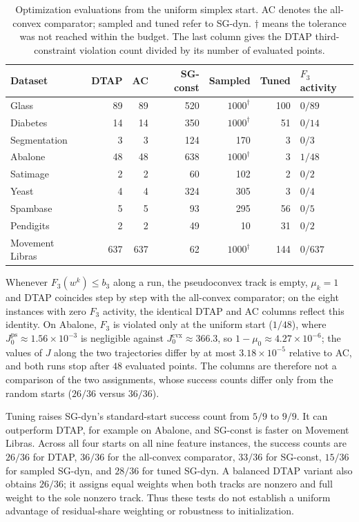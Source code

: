 \documentclass[]{interact}
\theoremstyle{plain}
\theoremstyle{definition}
\theoremstyle{remark}
\newcommand{\cvx}{\mathrm{cvx}}
\newcommand{\ps}{\mathrm{ps}}
\begin{document}
\begin{table}[t]
\centering\small
\setlength{\tabcolsep}{4pt}
\caption{Optimization evaluations from the uniform simplex start.
AC denotes the all-convex comparator; sampled and tuned refer to SG-dyn.
$\dagger$ means the tolerance was not reached within the budget.
The last column gives the DTAP third-constraint violation count divided
by its number of evaluated points.}
\label{tab:activation-tuning}
\begin{tabular}{@{}lrrrrrl@{}}
\toprule
Dataset & DTAP & AC & SG-const & Sampled & Tuned & $F_3$ activity\\
\midrule
Glass        & 89 & 89 & 520 & $1000^\dagger$ & 100 & $0/89$\\
Diabetes     & 14 & 14 & 350 & $1000^\dagger$ & 51 & $0/14$\\
Segmentation & 3 & 3 & 124 & 170 & 3 & $0/3$\\
Abalone      & 48 & 48 & 638 & $1000^\dagger$ & 3 & $1/48$\\
Satimage     & 2 & 2 & 60 & 102 & 2 & $0/2$\\
Yeast        & 4 & 4 & 324 & 305 & 3 & $0/4$\\
Spambase     & 5 & 5 & 93 & 295 & 56 & $0/5$\\
Pendigits    & 2 & 2 & 49 & 10 & 31 & $0/2$\\
\midrule
Movement Libras & 637 & 637 & 62 & $1000^\dagger$ & 144 & $0/637$\\
\bottomrule
\end{tabular}
\end{table}

Whenever $F_3(w^k)\le b_3$ along a run, the pseudoconvex track is empty,
$\mu_k=1$ and DTAP coincides step by step with the all-convex comparator;
on the eight instances with zero $F_3$ activity, the identical DTAP and AC
columns reflect this identity. On Abalone, $F_3$ is violated only at the uniform
start ($1/48$), where $J^{\ps}_0\approx1.56\times10^{-3}$ is negligible against
$J^{\cvx}_0\approx366.3$, so $1-\mu_0\approx4.27\times10^{-6}$; the values of $J$
along the two trajectories differ by at most $3.18\times10^{-5}$ relative to AC,
and both runs stop after $48$ evaluated points. The columns
are therefore not a comparison of the two assignments, whose success counts
differ only from the random starts ($26/36$ versus $36/36$).

Tuning raises SG-dyn's standard-start success count from $5/9$ to $9/9$.
It can outperform DTAP, for example on Abalone, and SG-const is faster
on Movement Libras. Across all four starts on all nine feature instances,
the success counts are $26/36$ for DTAP, $36/36$ for the all-convex
comparator, $33/36$ for SG-const, $15/36$ for sampled SG-dyn, and $28/36$
for tuned SG-dyn. A balanced DTAP variant also obtains $26/36$; it assigns
equal weights when both tracks are nonzero and full weight to the sole
nonzero track. Thus these tests do not establish a uniform advantage of
residual-share weighting or robustness to initialization.
\end{document}
